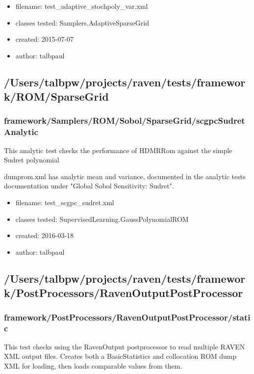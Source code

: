       \begin{itemize}
          \item filename: test\_adaptive\_stochpoly\_var.xml
          \item classes tested: Samplers.AdaptiveSparseGrid
          \item created: 2015-07-07
          \item author: talbpaul
      \end{itemize}
  \subsection{/Users/talbpw/projects/raven/tests/framework/ROM/SparseGrid}
    \subsubsection{framework/Samplers/ROM/Sobol/SparseGrid/scgpcSudretAnalytic}
      
      This analytic test checks the performance of HDMRRom against the simple Sudret polynomial
    

      
      dumprom.xml has analytic mean and variance, documented in the analytic tests documentation under
      "Global Sobol Sensitivity: Sudret".
    
      \begin{itemize}
          \item filename: test\_scgpc\_sudret.xml
          \item classes tested: SupervisedLearning.GaussPolynomialROM
          \item created: 2016-03-18
          \item author: talbpaul
      \end{itemize}
  \subsection{/Users/talbpw/projects/raven/tests/framework/PostProcessors/RavenOutputPostProcessor}
    \subsubsection{framework/PostProcessors/RavenOutputPostProcessor/static}
      
      This test checks using the RavenOutput postprocessor to read multiple RAVEN XML output files.
      Creates both a BasicStatistics and collocation ROM dump XML for loading, then loads comparable values from them.
    
